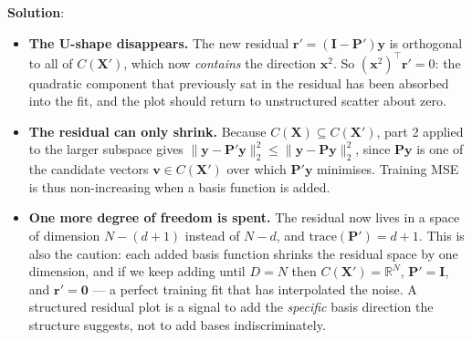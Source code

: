 \documentclass[submit]{../harvardml}
\newenvironment{solution}{
    \vspace{2mm}
    \color{blue}\noindent\textbf{Solution}:
}{}
\begin{document}
\begin{solution}
\begin{enumerate}
\begin{itemize}
  \item \textbf{The U-shape disappears.} The new residual
    $\mathbf r' = (\mathbf I - \mathbf P')\mathbf y$ is orthogonal to all of
    $C(\mathbf X')$, which now \emph{contains} the direction $\mathbf x^2$.
    So $(\mathbf x^2)^\top \mathbf r' = 0$: the quadratic component that
    previously sat in the residual has been absorbed into the fit, and the plot
    should return to unstructured scatter about zero.
  \item \textbf{The residual can only shrink.} Because
    $C(\mathbf X) \subseteq C(\mathbf X')$, part 2 applied to the larger
    subspace gives
    $\|\mathbf y - \mathbf P'\mathbf y\|_2^2 \leq \|\mathbf y - \mathbf P\mathbf y\|_2^2$,
    since $\mathbf P\mathbf y$ is one of the candidate vectors
    $\mathbf v \in C(\mathbf X')$ over which $\mathbf P'\mathbf y$ minimises.
    Training MSE is thus non-increasing when a basis function is added.
  \item \textbf{One more degree of freedom is spent.} The residual now lives in
    a space of dimension $N - (d+1)$ instead of $N - d$, and
    $\mathrm{trace}(\mathbf P') = d+1$. This is also the caution: each added
    basis function shrinks the residual space by one dimension, and if we keep
    adding until $D = N$ then $C(\mathbf X') = \mathbb{R}^N$, $\mathbf P' =
    \mathbf I$, and $\mathbf r' = \mathbf 0$ --- a perfect training fit that
    has interpolated the noise. A structured residual plot is a signal to add
    the \emph{specific} basis direction the structure suggests, not to add
    bases indiscriminately.
\end{itemize}

\end{enumerate}

\end{solution}

\newpage

\end{document}
